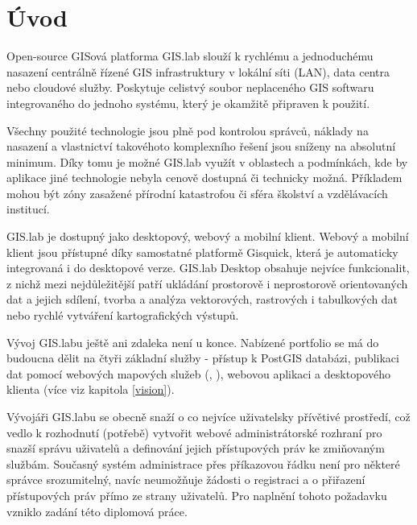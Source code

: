 \chapter{Úvod}
\label{1-uvod}


Open-source GISová platforma GIS.lab slouží k rychlému a jednoduchému nasazení centrálně řízené GIS infrastruktury v lokální síti (LAN), data centra nebo cloudové služby. Poskytuje celistvý soubor neplaceného GIS softwaru integrovaného do jednoho systému, který je okamžitě připraven k použití.
 
Všechny použité technologie jsou plně pod kontrolou správců, náklady na nasazení a vlastnictví takovéhoto komplexního řešení jsou sníženy na absolutní minimum. Díky tomu je možné GIS.lab využít v oblastech a podmínkách, kde by aplikace jiné technologie nebyla cenově dostupná či technicky možná. Příkladem mohou být zóny zasažené přírodní katastrofou či sféra školství a vzdělávacích institucí.

GIS.lab je dostupný jako desktopový, webový a mobilní klient. Webový a mobilní klient jsou přístupné díky samostatné platformě Gisquick, která je automaticky integrovaná i do desktopové verze. GIS.lab Desktop obsahuje nejvíce funkcionalit, z nichž mezi nejdůležitější patří ukládání prostorově i neprostorově orientovaných dat a jejich sdílení, tvorba a analýza vektorových, rastrových i tabulkových dat nebo rychlé vytváření kartografických výstupů.

Vývoj GIS.labu ještě ani zdaleka není u konce. Nabízené portfolio se má do budoucna dělit na čtyři základní služby - přístup k PostGIS databázi, publikaci dat pomocí webových mapových služeb (, ), webovou aplikaci a desktopového klienta (více viz kapitola \ref{vision}). 


Vývojáři GIS.labu se obecně snaží o co nejvíce uživatelsky přívětivé prostředí, což vedlo k rozhodnutí (potřebě) vytvořit webové administrátorské rozhraní pro snazší správu uživatelů a definování jejich přístupových práv ke zmiňovaným službám. Současný systém administrace přes příkazovou řádku není pro některé správce srozumitelný, navíc neumožňuje žádosti o registraci a o přiřazení přístupových práv přímo ze strany uživatelů. Pro naplnění tohoto požadavku vzniklo zadání této diplomová práce.

